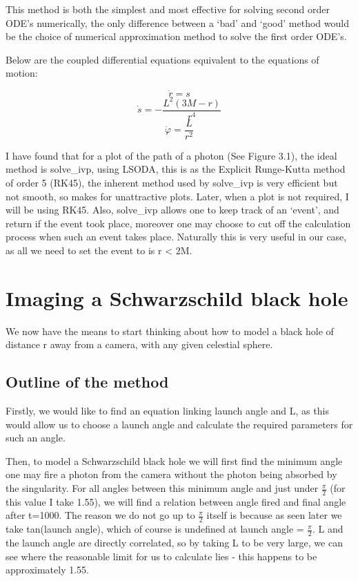 \documentclass[oneside,openright,frontopenright]{dmathesis}
\begin{document}
	This method is both the simplest and most effective for solving second order ODE’s numerically, the only difference between a ‘bad’ and ‘good’ method would be the choice of numerical approximation method to solve the first order ODE’s.

	Below are the coupled differential equations equivalent to the equations of motion:

	\[\dot{r}= s\]
	\[\dot{s}=-\frac{L^2(3M-r)}{r^4}\]
	\[\dot{\varphi}=\frac{L}{r^2}\]

	I have found that for a plot of the path of a photon (See Figure 3.1), the ideal method is solve\_ivp\cite{2020SciPy-NMeth}, using LSODA\cite{hindmarsh2005lsoda}, this is as the Explicit Runge-Kutta method of order 5 (RK45)\cite{fehlberg1969low}, the inherent method used by solve\_ivp is very efficient but not smooth, so makes for unattractive plots. Later, when a plot is not required, I will be using RK45. Also, solve\_ivp allows one to keep track of an ‘event’, and return if the event took place, moreover one may choose to cut off the calculation process when such an event takes place. Naturally this is very useful in our case, as all we need to set the event to is r < 2M.


\chapter{Imaging a Schwarzschild black hole}

	We now have the means to start thinking about how to model a black hole of distance r away from a camera, with any given celestial sphere.

\section{Outline of the method}

	Firstly, we would like to find an equation linking launch angle and L, as this would allow us to choose a launch angle and calculate the required parameters for such an angle.

	Then, to model a Schwarzschild black hole we will first find the minimum angle one may fire a photon from the camera without the photon being absorbed by the singularity. For all angles between this minimum angle and just under $\frac{\pi}{2}$ (for this value I take 1.55), we will find a relation between angle fired and final angle after t=1000. The reason we do not go up to $\frac{\pi}{2}$ itself is because as seen later we take tan(launch angle), which of course is undefined at launch angle = $\frac{\pi}{2}$. L and the launch angle are directly correlated, so by taking L to be very large, we can see where the reasonable limit for us to calculate lies - this happens to be approximately 1.55.
\end{document}
